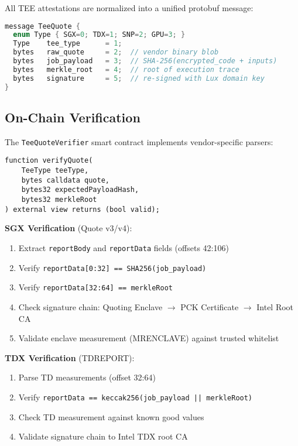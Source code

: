 \documentclass[11pt,letterpaper]{article}
\begin{document}
All TEE attestations are normalized into a unified protobuf message:

\begin{lstlisting}[language=C,caption={Unified TeeQuote Protocol Buffer}]
message TeeQuote {
  enum Type { SGX=0; TDX=1; SNP=2; GPU=3; }
  Type    tee_type      = 1;
  bytes   raw_quote     = 2;  // vendor binary blob
  bytes   job_payload   = 3;  // SHA-256(encrypted_code + inputs)
  bytes   merkle_root   = 4;  // root of execution trace
  bytes   signature     = 5;  // re-signed with Lux domain key
}
\end{lstlisting}

\subsection{On-Chain Verification}

The \texttt{TeeQuoteVerifier} smart contract implements vendor-specific parsers:

\begin{lstlisting}[caption={Solidity Verification Interface},label={lst:verifier}]
function verifyQuote(
    TeeType teeType,
    bytes calldata quote,
    bytes32 expectedPayloadHash,
    bytes32 merkleRoot
) external view returns (bool valid);
\end{lstlisting}

\textbf{SGX Verification} (Quote v3/v4):
\begin{enumerate}
  \item Extract \texttt{reportBody} and \texttt{reportData} fields (offsets 42:106)
  \item Verify \texttt{reportData[0:32] == SHA256(job\_payload)}
  \item Verify \texttt{reportData[32:64] == merkleRoot}
  \item Check signature chain: Quoting Enclave $\rightarrow$ PCK Certificate $\rightarrow$ Intel Root CA
  \item Validate enclave measurement (MRENCLAVE) against trusted whitelist
\end{enumerate}

\textbf{TDX Verification} (TDREPORT):
\begin{enumerate}
  \item Parse TD measurements (offset 32:64)
  \item Verify \texttt{reportData == keccak256(job\_payload || merkleRoot)}
  \item Check TD measurement against known good values
  \item Validate signature chain to Intel TDX root CA
\end{enumerate}
\end{document}
